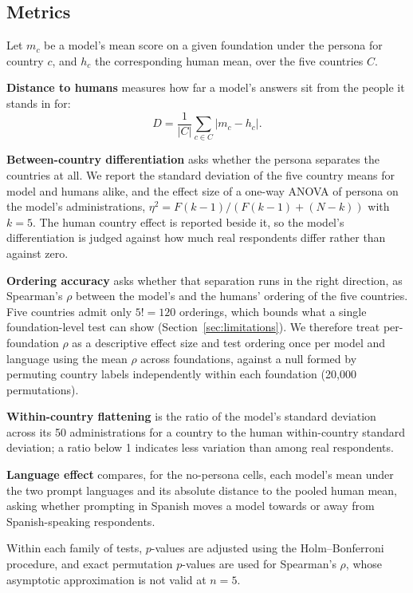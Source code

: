 \subsection{Metrics}
\label{subsec:metrics}

Let $m_c$ be a model's mean score on a given foundation under the persona for
country $c$, and $h_c$ the corresponding human mean, over the five countries $C$.

\textbf{Distance to humans} measures how far a model's answers sit from the
people it stands in for:
\begin{equation}
D = \frac{1}{|C|}\sum_{c \in C} \left| m_c - h_c \right|.
\end{equation}

\textbf{Between-country differentiation} asks whether the persona separates the
countries at all. We report the standard deviation of the five country means for
model and humans alike, and the effect size of a one-way ANOVA of persona on the
model's administrations, $\eta^2 = F(k-1)/\left(F(k-1)+(N-k)\right)$ with $k=5$.
The human country effect is reported beside it, so the model's differentiation is
judged against how much real respondents differ rather than against zero.

\textbf{Ordering accuracy} asks whether that separation runs in the right
direction, as Spearman's $\rho$ between the model's and the humans' ordering of
the five countries. Five countries admit only $5!=120$ orderings, which bounds
what a single foundation-level test can show (Section~\ref{sec:limitations}). We
therefore treat per-foundation $\rho$ as a descriptive effect size and test
ordering once per model and language using the mean $\rho$ across foundations,
against a null formed by permuting country labels independently within each
foundation (20{,}000 permutations).

\textbf{Within-country flattening} is the ratio of the model's standard deviation
across its 50 administrations for a country to the human within-country standard
deviation; a ratio below 1 indicates less variation than among real respondents.

\textbf{Language effect} compares, for the no-persona cells, each model's mean
under the two prompt languages and its absolute distance to the pooled human mean,
asking whether prompting in Spanish moves a model towards or away from
Spanish-speaking respondents.

Within each family of tests, $p$-values are adjusted using the Holm--Bonferroni
procedure, and exact permutation $p$-values are used for Spearman's $\rho$, whose
asymptotic approximation is not valid at $n=5$.
